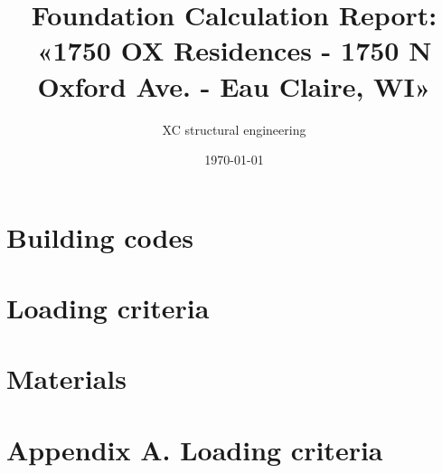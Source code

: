 

\usepackage{array, boldline, makecell, booktabs}
\newcommand\btrule[1]{\specialrule{#1}{0pt}{0pt}}
\usepackage{colortbl}
\usepackage{multicol,caption}               %
\usepackage{xcolor}
\newenvironment{Figure}
  {\par\medskip\noindent\minipage{\linewidth}}
  {\endminipage\par\medskip}

\title{Foundation Calculation Report: «1750 OX Residences - 1750 N Oxford Ave. - Eau Claire, WI» }
\author{XC structural engineering}
\date{\today}
\newcommand{\revision}{0.0}
\newcommand{\titdocum}{Foundation Calculation Report}

\maketitle
\tableofcontents
\listoftables
\listoffigures
\section{Building codes}

\section{Loading criteria}

\section{Materials}


\clearpage
\appendix
\section{Appendix A. Loading criteria}


